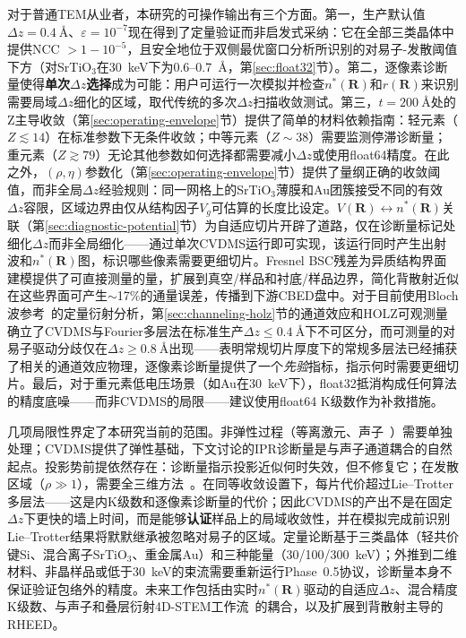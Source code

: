 \documentclass[twoside,11pt]{ctexart}
\begin{document}
对于普通TEM从业者，本研究的可操作输出有三个方面。第一，生产默认值$\Delta z=\SI{0.4}{\angstrom}$、$\varepsilon=10^{-7}$现在得到了定量验证而非启发式采纳：它在全部三类晶体中提供NCC $>1-10^{-5}$，且安全地位于双侧最优窗口分析所识别的对易子-发散阈值下方（对SrTiO$_3$在\SI{30}{\keV}下为0.6--0.7~\AA{}，第\ref{sec:float32}节）。第二，逐像素诊断量使得\textbf{单次$\Delta z$选择}成为可能：用户可运行一次模拟并检查$n^*(\mathbf{R})$和$r(\mathbf{R})$来识别需要局域$\Delta z$细化的区域，取代传统的多次$\Delta z$扫描收敛测试。第三，$t=\SI{200}{\angstrom}$处的Z主导收敛（第\ref{sec:operating-envelope}节）提供了简单的材料依赖指南：轻元素（$Z\lesssim14$）在标准参数下无条件收敛；中等元素（$Z\sim38$）需要监测停滞诊断量；重元素（$Z\gtrsim79$）无论其他参数如何选择都需要减小$\Delta z$或使用float64精度。在此之外，$(\rho,\eta)$参数化（第\ref{sec:operating-envelope}节）提供了量纲正确的收敛阈值，而非全局$\Delta z$经验规则：同一网格上的SrTiO$_3$薄膜和Au团簇接受不同的有效$\Delta z$容限，区域边界由仅从结构因子$V_g$可估算的长度比设定。$V(\mathbf{R})\leftrightarrow n^*(\mathbf{R})$关联（第\ref{sec:diagnostic-potential}节）为自适应切片开辟了道路，仅在诊断量标记处细化$\Delta z$而非全局细化——通过单次CVDMS运行即可实现，该运行同时产生出射波和$n^*(\mathbf{R})$图，标识哪些像素需要更细切片。Fresnel BSC残差为异质结构界面建模提供了可直接测量的量，扩展到真空/样品和衬底/样品边界，简化背散射近似在这些界面可产生$\sim$17\%的通量误差，传播到下游CBED盘中。对于目前使用Bloch波参考~\cite{Kirkland2020,PennycookNellist2011,Allen2003}的定量衍射分析，第\ref{sec:channeling-holz}节的通道效应和HOLZ可观测量确立了CVDMS与Fourier多层法在标准生产$\Delta z\le\SI{0.4}{\angstrom}$下不可区分，而可测量的对易子驱动分歧仅在$\Delta z\ge\SI{0.8}{\angstrom}$出现——表明常规切片厚度下的常规多层法已经捕获了相关的通道效应物理，逐像素诊断量提供了一个\textit{先验}指标，指示何时需要更细切片。最后，对于重元素低电压场景（如Au在\SI{30}{\keV}下），float32抵消构成任何算法的精度底噪——而非CVDMS的局限——建议使用float64 K级数作为补救措施。

几项局限性界定了本研究当前的范围。非弹性过程（等离激元、声子~\cite{Forbes2010}）需要单独处理；CVDMS提供了弹性基础，下文讨论的IPR诊断量是与声子通道耦合的自然起点。投影势前提依然存在：诊断量指示投影近似何时失效，但不修复它；在发散区域（$\rho\gg1$），需要全三维方法~\cite{LobatoVanDyck2014}。在同等收敛设置下，每片代价超过Lie--Trotter多层法——这是内K级数和逐像素诊断量的代价；因此CVDMS的产出不是在固定$\Delta z$下更快的墙上时间，而是能够\textbf{认证}样品上的局域收敛性，并在模拟完成前识别Lie--Trotter结果将默默继承被忽略对易子的区域。定量论断基于三类晶体（轻共价键Si、混合离子SrTiO$_3$、重金属Au）和三种能量（30/100/300~keV）；外推到二维材料、非晶样品或低于\SI{30}{\keV}的束流需要重新运行Phase~0.5协议，诊断量本身不保证验证包络外的精度。未来工作包括由实时$n^*(\mathbf{R})$驱动的自适应$\Delta z$、混合精度K级数、与声子和叠层衍射4D-STEM工作流~\cite{Savitzky2021}的耦合，以及扩展到背散射主导的RHEED。
\end{document}
